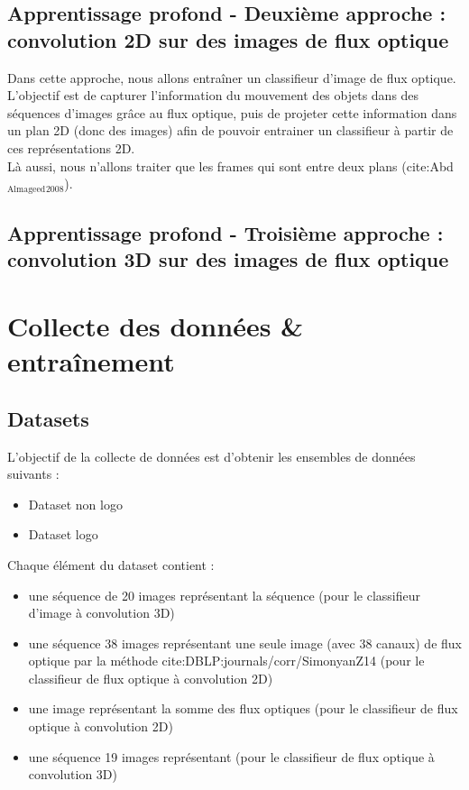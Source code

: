 \documentclass[11pt]{article}
\begin{document}
\subsection{Apprentissage profond - Deuxième approche : convolution 2D sur des images de flux optique}
\label{sec:org1c0af44}
Dans cette approche, nous allons entraîner un classifieur d'image de flux optique.\\
L'objectif est de capturer l'information du mouvement des objets dans des séquences d'images grâce au flux optique, puis de projeter cette information dans un plan 2D (donc des images) afin de pouvoir entrainer un classifieur à partir de ces représentations 2D.\\
Là aussi, nous n'allons traiter que les frames qui sont entre deux plans (cite:Abd\(_{\text{Almageed}}\)\(_{\text{2008}}\)).\\

\subsection{Apprentissage profond - Troisième approche : convolution 3D sur des images de flux optique}
\label{sec:orgfac16bb}

\section{Collecte des données \& entraînement}
\label{sec:org1e90fbb}
\subsection{Datasets}
\label{sec:org86fbc40}
L'objectif de la collecte de données est d'obtenir les ensembles de données suivants :\\
\begin{itemize}
\item Dataset non logo\\
\item Dataset logo\\
\end{itemize}
Chaque élément du dataset contient :\\
\begin{itemize}
\item une séquence de 20 images représentant la séquence (pour le classifieur d'image à convolution 3D)\\
\item une séquence 38 images représentant une seule image (avec 38 canaux) de flux optique par la méthode cite:DBLP:journals/corr/SimonyanZ14 (pour le classifieur de flux optique à convolution 2D)\\
\item une image représentant la somme des flux optiques (pour le classifieur de flux optique à convolution 2D)\\
\item une séquence 19 images représentant (pour le classifieur de flux optique à convolution 3D)\\
\end{itemize}
\end{document}
